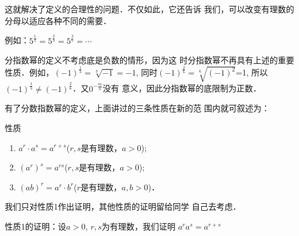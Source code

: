 这就解决了定义的合理性的问题．不仅如此，它还告诉
我们，可以改变有理数的分母以适应各种不同的需要．

例如：$5^{\tfrac{1}{2}}=5^{\tfrac{2}{4}}=5^{\tfrac{3}{6}}=\cdots$

\begin{rmk}
    分指数幂的定义不考虑底是负数的情形，因为这
    时分指数幂不再具有上述的重要性质．例如，$(-1)^{\tfrac{1}{3}}=\sqrt[3]{-1}=-1$, 同时$(-1)^{\tfrac{2}{6}}=\sqrt[6]{(-1)^2}$=1, 所以$(-1)^{\tfrac{1}{3}}\ne (-1)^{\tfrac{2}{6}}$．又$0^{-\tfrac{m}{n}}$没有
意义，因此分指数幂的底限制为正数．
\end{rmk}

有了分数指数幂的定义，上面讲过的三条性质在新的范
围内就可叙述为：
\begin{blk}{性质}
\begin{enumerate}
    \item  $a^r\cdot a^s=a^{r+s}$\quad ($r,s$是有理数，$a>0$);
    \item  $(a^r)^s=a^{rs}$\quad ($r,s$是有理数，$a>0$);
    \item  $(ab)^r=a^r\cdot b^r$\quad ($r$是有理数，$a,b>0$)．
\end{enumerate}  
\end{blk}

我们只对性质1作出证明，其他性质的证明留给同学
自己去考虑．

性质1的证明：设$a>0$, $r,s$为有理数，我们证明
$a^r a^s=a^{r+s}$


